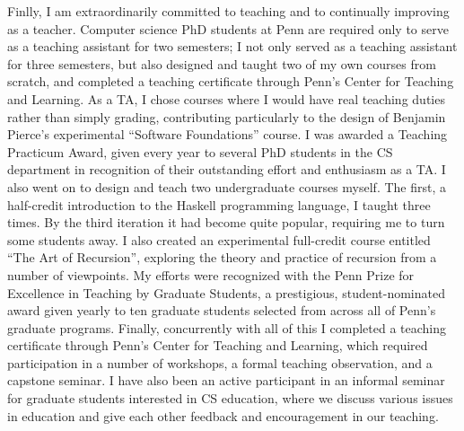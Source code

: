 \documentclass[12pt]{article}
\begin{document}
Finlly, I am extraordinarily committed to teaching and to continually
improving as a teacher.  Computer science PhD students at Penn are
required only to serve as a teaching assistant for two semesters; I
not only served as a teaching assistant for three semesters, but also
designed and taught two of my own courses from scratch, and completed
a teaching certificate through Penn's Center for Teaching and
Learning.  As a TA, I chose courses where I would have real teaching
duties rather than simply grading, contributing particularly to the
design of Benjamin Pierce's experimental ``Software Foundations''
course. I was awarded a Teaching Practicum Award, given every year to
several PhD students in the CS department in recognition of their
outstanding effort and enthusiasm as a TA.  I also went on to design
and teach two undergraduate courses myself. The first, a half-credit
introduction to the Haskell programming language, I taught three
times.  By the third iteration it had become quite popular, requiring
me to turn some students away.  I also created an experimental
full-credit course entitled ``The Art of Recursion'', exploring the
theory and practice of recursion from a number of viewpoints.  My
efforts were recognized with the Penn Prize for Excellence in Teaching
by Graduate Students, a prestigious, student-nominated award given
yearly to ten graduate students selected from across all of Penn's
graduate programs.  Finally, concurrently with all of this I completed
a teaching certificate through Penn's Center for Teaching and
Learning, which required participation in a number of workshops, a
formal teaching observation, and a capstone seminar.  I have also been
an active participant in an informal seminar for graduate students
interested in CS education, where we discuss various issues in
education and give each other feedback and encouragement in our
teaching.
\end{document}
